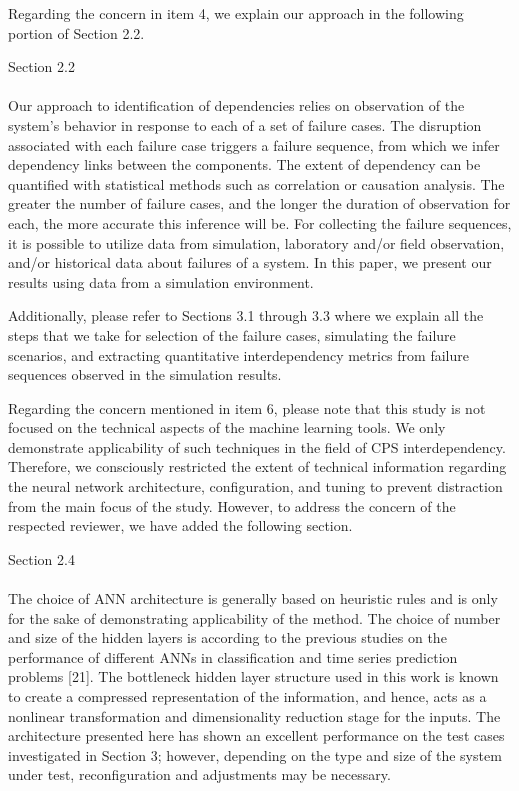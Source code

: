\documentclass{article}
\newenvironment{response}{
  \doublespacing
  \setlength\parindent{0.05\linewidth}
  \ttfamily
}{}
\newenvironment{textblock}[1]
{\begin{tcolorbox}[breakable,enhanced]{#1 \\ \\}}
{\end{tcolorbox}}
\begin{document}
\begin{response}
Regarding the concern in item 4, we explain our approach in the following portion of Section 2.2.

\begin{textblock}{Section 2.2}
Our approach to identification of dependencies relies on observation of the system's behavior in response to each of a set of failure cases. The disruption associated with each failure case triggers a failure sequence, from which we infer dependency links between the components. The extent of dependency can be quantified with statistical methods such as correlation or causation analysis. The greater the number of failure cases, and the longer the duration of observation for each, the more accurate this inference will be. For collecting the failure sequences, it is possible to utilize data from simulation, laboratory and/or field observation, and/or historical data about failures of a system. In this paper, we present our results using data from a simulation environment.
\end{textblock}

Additionally, please refer to Sections 3.1 through 3.3 where we explain all the steps that we take for selection of the failure cases, simulating the failure scenarios, and extracting quantitative interdependency metrics from failure sequences observed in the simulation results.

Regarding the concern mentioned in item 6, please note that this study is not focused on the technical aspects of the machine learning tools. We only demonstrate applicability of such techniques in the field of CPS interdependency. Therefore, we consciously restricted the extent of technical information regarding the neural network architecture, configuration, and tuning to prevent distraction from the main focus of the study. However, to address the concern of the respected reviewer, we have added the following section.

\begin{textblock}{Section 2.4}
The choice of ANN architecture is generally based on heuristic rules and is only for the sake of demonstrating applicability of the method. The choice of number and size of the hidden layers is according to the previous studies on the performance of different ANNs in classification and time series prediction problems [21]. The bottleneck hidden layer structure used in this work is known to create a compressed representation of the information, and hence, acts as a nonlinear transformation and dimensionality reduction stage for the inputs. The architecture presented here has shown an excellent performance on the test cases investigated in Section 3; however, depending on the type and size of the system under test, reconfiguration and adjustments may be necessary.
\end{textblock}


\end{response}
\end{document}
